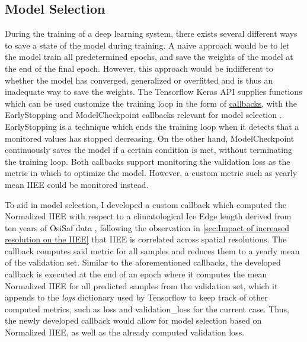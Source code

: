 \documentclass[../main/thesis]{subfiles}
\begin{document}
\subsection{Model Selection}
During the training of a deep learning system, there exists several different ways to save a state of the model during training. A naive approach would be to let the model train all predetermined epochs, and save the weights of the model at the end of the final epoch. However, this approach would be indifferent to whether the model has converged, generalized or overfitted and is thus an inadequate way to save the weights. The Tensorflow Keras API supplies functions which can be used customize the training loop in the form of \href{https://www.tensorflow.org/api_docs/python/tf/keras/callbacks}{callbacks}, with the EarlyStopping and ModelCheckpoint callbacks relevant for model selection \cite{tensorflow2015-whitepaper}. EarlyStopping is a technique which ends the training loop when it detects that a monitored values has stopped decreasing. On the other hand, ModelCheckpoint continuously saves the model if a certain condition is met, without terminating the training loop. Both callbacks support monitoring the validation loss as the metric in which to optimize the model. However, a custom metric such as yearly mean IIEE \cite{Goessling2016} could be monitored instead. 

To aid in model selection, I developed a custom callback which computed the Normalized IIEE with respect to a climatological Ice Edge length derived from ten years of OsiSaf data , following the observation in \ref{sec:Impact of increased resolution on the IIEE} that IIEE is correlated across spatial resolutions. The callback computes said metric for all samples and reduces them to a yearly mean of the validation set. Similar to the aforementioned callbacks, the developed callback is executed at the end of an epoch where it computes the mean Normalized IIEE for all predicted samples from the validation set, which it appends to the \textit{logs} dictionary used by Tensorflow to keep track of other computed metrics, such as loss and validation\_loss for the current case. Thus, the newly developed callback would allow for model selection based on Normalized IIEE, as well as the already computed validation loss.
\end{document}
